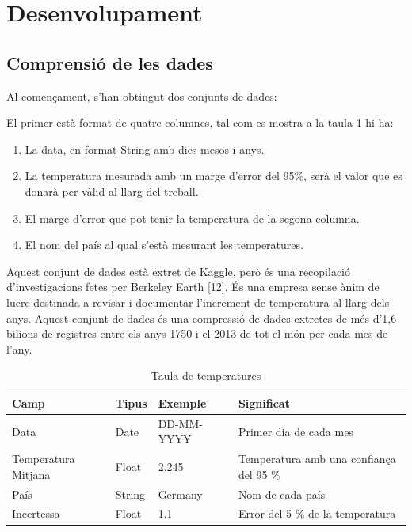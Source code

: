 \documentclass[10pt,a4paper,twocolumn,twoside]{article}
\begin{document}
\section {Desenvolupament}
\subsection{Comprensió de les dades}
Al començament, s'han obtingut dos conjunts de dades:

El primer està format de quatre columnes, tal com es mostra a la taula 1 hi ha:
\begin{enumerate}
\item La data, en format String amb dies mesos i anys.
\item La temperatura mesurada amb un marge d'error del 95\%, serà el valor que es donarà per vàlid al llarg del treball. 
\item El marge d'error que pot tenir la temperatura de la segona columna.
\item El nom del país al qual s'està mesurant les temperatures. 
\end{enumerate}
Aquest conjunt de dades està extret de Kaggle, però és una recopilació d'investigacions fetes per Berkeley Earth [12]. És una empresa sense ànim de lucre destinada a revisar i documentar l'increment de temperatura al llarg dels anys. Aquest conjunt de dades és una compressió de dades extretes de més d'1,6 bilions de registres entre els anys 1750 i el 2013 de tot el món per cada mes de l'any.
\begin{table}[th]
\caption{Taula de temperatures}
\begin{center}
\begin{tabular}{  m{2cm} m{1cm} m{1cm} m{2cm} }
\hline\hline %
Camp & Tipus & Exemple & Significat \\
\hline
Data & Date & DD-MM-YYYY & Primer dia de cada mes \\
\hline
Temperatura Mitjana & Float & 2.245 & Temperatura amb una confiança del 95 \%  \\
\hline
País & String & Germany & Nom de cada país \\
\hline
Incertessa & Float & 1.1 & Error del 5 \% de la temperatura\\
\hline
\hline
\end{tabular}
\end{center}
\end{table}
\end{document}

